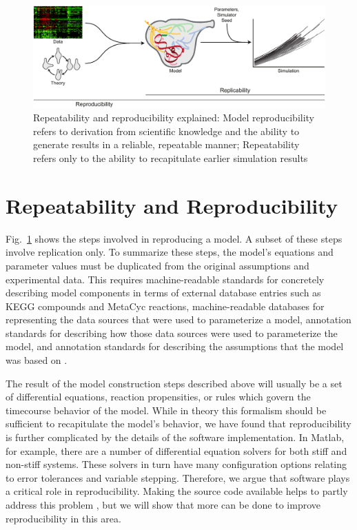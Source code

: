 \documentclass[journal,transmag,twoside]{IEEEtran}
\begin{document}
\begin{figure}[!t]
\centering
\includegraphics[width=\textwidth]{figure1/figure1}
\caption{Repeatability and reproducibility explained: Model reproducibility refers to derivation from scientific knowledge and the ability to generate results in a reliable, repeatable manner;
Repeatability refers only to the ability to recapitulate earlier simulation results}
\label{fig_repro_diagram}
\end{figure}

\section{Repeatability and Reproducibility}

Fig.~\ref{fig_repro_diagram} shows the steps involved in reproducing a model. A subset of these steps involve replication only. To summarize these steps, the model's equations and parameter values must be duplicated from the original assumptions and experimental data. This requires machine-readable standards for concretely describing model components in terms of external database entries such as KEGG \cite{kanehisa2000kegg} compounds and MetaCyc \cite{caspi2008metacyc} reactions, machine-readable databases for representing the data sources that were used to parameterize a model, annotation standards for describing how those data sources were used to parameterize the model, and annotation standards for describing the assumptions that the model was based on \cite{boulton2012open}.

The result of the model construction steps described above will usually be a set of differential equations, reaction propensities, or rules which govern the timecourse behavior of the model. While in theory this formalism should be sufficient to recapitulate the model's behavior, we have found that reproducibility is further complicated by the details of the software implementation. In Matlab, for example, there are a number of differential equation solvers for both stiff and non-stiff systems. These solvers in turn have many configuration options relating to error tolerances and variable stepping. Therefore, we argue that software plays a critical role in reproducibility. Making the source code available helps to partly address this problem \cite{easterbrook2014open}, but we will show that more can be done to improve reproducibility in this area.
\end{document}
